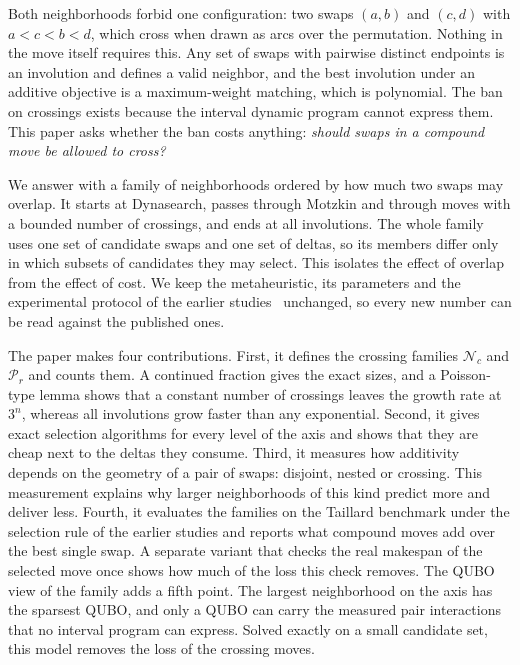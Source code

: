 \documentclass{article}
\newcommand{\N}{\mathcal{N}}
\newcommand{\Pa}{\mathcal{P}}
\begin{document}
Both neighborhoods forbid one configuration: two swaps $(a,b)$ and
$(c,d)$ with $a<c<b<d$, which cross when drawn as arcs over the
permutation. Nothing in the move itself requires this. Any set of swaps
with pairwise distinct endpoints is an involution and defines a valid
neighbor, and the best involution under an additive objective is a
maximum-weight matching, which is polynomial. The ban on crossings
exists because the interval dynamic program cannot express them. This
paper asks whether the ban costs anything: \emph{should swaps in a
compound move be allowed to cross?}

We answer with a family of neighborhoods ordered by how much two swaps
may overlap. It starts at Dynasearch, passes through Motzkin and through
moves with a bounded number of crossings, and ends at all involutions.
The whole family uses one set of candidate swaps and one set of deltas,
so its members differ only in which subsets of candidates they may
select. This isolates the effect of overlap from the effect of cost. We
keep the metaheuristic, its parameters and the experimental protocol of
the earlier studies~\cite{motzkin_own,windowed_own} unchanged, so every
new number can be read against the published ones.

The paper makes four contributions. First, it defines the crossing
families $\N_c$ and $\Pa_r$ and counts them. A continued fraction gives
the exact sizes, and a Poisson-type lemma shows that a constant number
of crossings leaves the growth rate at $3^n$, whereas all involutions
grow faster than any exponential. Second, it gives exact selection
algorithms for every level of the axis and shows that they are cheap
next to the deltas they consume. Third, it measures how additivity
depends on the geometry of a pair of swaps: disjoint, nested or
crossing. This measurement explains why larger neighborhoods of this
kind predict more and deliver less. Fourth, it evaluates the families on
the Taillard benchmark under the selection rule of the earlier studies
and reports what compound moves add over the best single swap. A
separate variant that checks the real makespan of the selected move
once shows how much of the loss this check removes. The QUBO view of
the family adds a fifth point. The largest neighborhood on the axis has
the sparsest QUBO, and only a QUBO can carry the measured pair
interactions that no interval program can express. Solved exactly on a
small candidate set, this model removes the loss of the crossing moves.

\end{document}
